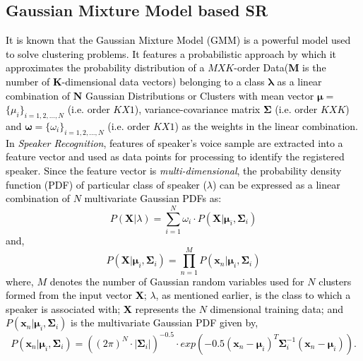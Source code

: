 \documentclass{article}
\begin{document}
\subsection{Gaussian Mixture Model based SR} 
\textcolor{black}{It is known that the Gaussian Mixture Model (GMM) is a 
powerful model used to solve clustering problems.  
It features a probabilistic approach by which it approximates the probability distribution of a $M$$X$$K$-order Data($\bm M$ is the number of $\bm K$-dimensional data vectors) belonging to a class $\bm\lambda$ as a linear combination of $\bm N$ Gaussian Distributions or Clusters %
with mean vector $\bm \mu$$=$$\{\mu_i\}_{i=1,2,\ldots,N}$ (i.e. order $K$$X$$1$), variance-covariance \textcolor{black}{matrix} %
${\bm\Sigma}$ (i.e. order $K$$X$$K$) and $\bm \omega$$=$$\{\omega_i\}_{i=1,2,\ldots,N}$ (i.e. order $K$$X$$1$) as the weights in the linear combination.} \textcolor{black}{In 
\textit{Speaker Recognition}, features of speaker's voice sample 
are extracted into a feature vector and used as data points for processing to identify the registered speaker. %
Since the feature vector is \textit{multi-dimensional}, %
the probability density function (PDF) 
of particular class of speaker ($\lambda$) can be expressed as a linear combination of $N$ multivariate Gaussian PDFs as:
\begin{equation}
P(\bm X\vert\lambda) = \sum\limits_{i=1}^N \omega_i \cdot P(\bm X|\bm \mu_i,\bm \Sigma_i)
\label{eq1}
\end{equation}
and,
\begin{equation}
P(\bm X|\bm \mu_i,\bm \Sigma_i) = \prod\limits_{n=1}^M P(\bm x_n|\bm \mu_i,\bm \Sigma_i)
\end{equation}
where, $M$ denotes the number of Gaussian random variables used for $N$ clusters formed from the input vector $\bm X$; \textbf{$\lambda$}, as mentioned earlier, is the class to which a speaker is associated with; $\bm X$ represents the $N$ dimensional training data; and $P(\bm x_n|\bm\mu_i,\bm\Sigma_i)$ is the multivariate Gaussian PDF given by,%
\begin{equation}
P(\bm x_n|\bm\mu_i,\bm\Sigma_i) = \left({{(2\pi)^N\cdot |\bm\Sigma_i|}}\right)^{-0.5}\cdot exp\left({-0.5 (\bm x_n-\bm\mu_i)^T\bm\Sigma_i^{-1}(\bm x_n- \bm \mu_i)}\right).
\end{equation}
}
\end{document}
